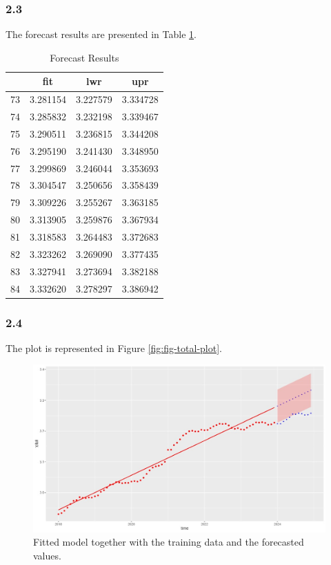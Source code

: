\documentclass[
]{article}
\begin{document}
\subsubsection{2.3}\label{section-4}

The forecast results are presented in Table \ref{tab:forecast-results}.

\begin{table}[htbp]
\centering
\caption{Forecast Results}
\label{tab:forecast-results}
\begin{tabular}{cccc}
\hline
& fit & lwr & upr \\
\hline
73 & 3.281154 & 3.227579 & 3.334728 \\
74 & 3.285832 & 3.232198 & 3.339467 \\
75 & 3.290511 & 3.236815 & 3.344208 \\
76 & 3.295190 & 3.241430 & 3.348950 \\
77 & 3.299869 & 3.246044 & 3.353693 \\
78 & 3.304547 & 3.250656 & 3.358439 \\
79 & 3.309226 & 3.255267 & 3.363185 \\
80 & 3.313905 & 3.259876 & 3.367934 \\
81 & 3.318583 & 3.264483 & 3.372683 \\
82 & 3.323262 & 3.269090 & 3.377435 \\
83 & 3.327941 & 3.273694 & 3.382188 \\
84 & 3.332620 & 3.278297 & 3.386942 \\
\hline
\end{tabular}
\end{table}

\subsubsection{2.4}\label{section-5}

The plot is represented in Figure \ref{fig:fig-total-plot}.

\begin{figure}

{\centering \includegraphics[width=0.7\linewidth]{plots/total_plot} 

}

\caption{\label{fig:fig-total-plot}Fitted model together with the training data and the forecasted values.}\label{fig:unnamed-chunk-3}
\end{figure}
\end{document}
